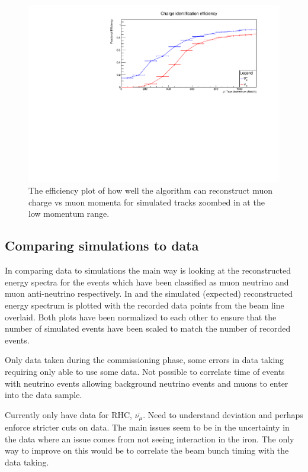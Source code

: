 \begin{figure}[h!]
\centering
\includegraphics[width=.9\textwidth]{figures/NeutrinoChap/NuFactTalk/fix4.pdf}
\caption{The efficiency plot of how well the algorithm can reconstruct muon charge vs muon momenta for simulated tracks zoombed in at the low momentum range.}
\label{fig:IronMINDCombinedZoom}
\end{figure}



\pagebreak
\newpage
\FloatBarrier
\subsection{Comparing simulations to data}
In comparing data to simulations the main way is looking at the reconstructed energy spectra for the events which have been classified as muon neutrino and muon anti-neutrino respectively. In  and  the simulated (expected) reconstructed energy spectrum is plotted with the recorded data points from the beam line overlaid. Both plots have been normalized to each other to ensure that the number of simulated events have been scaled to match the number of recorded events.

Only data taken during the commissioning phase, some errors in data taking requiring only able to use some data. Not possible to correlate time of events with neutrino events allowing background neutrino events and muons to enter into the data sample.

Currently only have data for RHC, $\bar{\nu_{\mu}}$. Need to understand deviation and perhaps enforce stricter cuts on data. The main issues seem to be in the uncertainty in the data where an issue comes from not seeing interaction in the iron. The only way to improve on this would be to correlate the beam bunch timing with the data taking. 


